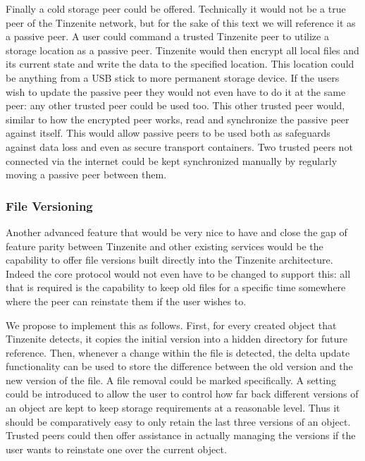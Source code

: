 Finally a cold storage peer could be offered.
Technically it would not be a true peer of the Tinzenite network, but for the sake of this text we will reference it as a passive peer.
A user could command a trusted Tinzenite peer to utilize a storage location as a passive peer.
Tinzenite would then encrypt all local files and its current state and write the data to the specified location.
This location could be anything from a USB stick to more permanent storage device.
If the users wish to update the passive peer they would not even have to do it at the same peer: any other trusted peer could be used too.
This other trusted peer would, similar to how the encrypted peer works, read and synchronize the passive peer against itself.
This would allow passive peers to be used both as safeguards against data loss and even as secure transport containers.
Two trusted peers not connected via the internet could be kept synchronized manually by regularly moving a passive peer between them.

\subsubsection{File Versioning}
\label{subs:File Versioning}

Another advanced feature that would be very nice to have and close the gap of feature parity between Tinzenite and other existing services would be the capability to offer file versions built directly into the Tinzenite architecture.
Indeed the core protocol would not even have to be changed to support this: all that is required is the capability to keep old files for a specific time somewhere where the peer can reinstate them if the user wishes to.

We propose to implement this as follows.
First, for every created object that Tinzenite detects, it copies the initial version into a hidden directory for future reference.
Then, whenever a change within the file is detected, the delta update functionality can be used to store the difference between the old version and the new version of the file.
A file removal could be marked specifically.
A setting could be introduced to allow the user to control how far back different versions of an object are kept to keep storage requirements at a reasonable level.
Thus it should be comparatively easy to only retain the last three versions of an object.
Trusted peers could then offer assistance in actually managing the versions if the user wants to reinstate one over the current object.
